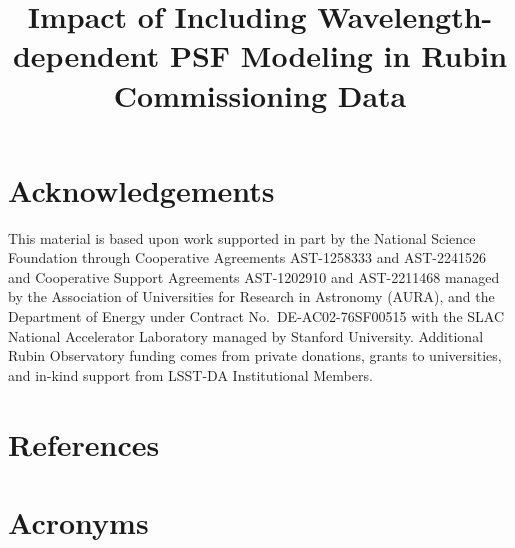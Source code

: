 \documentclass[SE,authoryear,toc]{lsstdoc}
\title{Impact of Including Wavelength-dependent PSF Modeling in Rubin Commissioning Data}
\date{\vcsDate}
\begin{document}
\maketitle










\appendix

\section{Acknowledgements}

This material is based upon work supported in part by the National Science Foundation through Cooperative Agreements AST-1258333 and AST-2241526 and Cooperative Support Agreements AST-1202910 and AST-2211468 managed by the Association of Universities for Research in Astronomy (AURA), and the Department of Energy under Contract No.\ DE-AC02-76SF00515 with the SLAC National Accelerator Laboratory managed by Stanford University.
Additional Rubin Observatory funding comes from private donations, grants to universities, and in-kind support from LSST-DA Institutional Members.

\section{References} \label{sec:bib}
\renewcommand{\refname}{} %


\section{Acronyms} \label{sec:acronyms}


\clearpage


\end{document}
